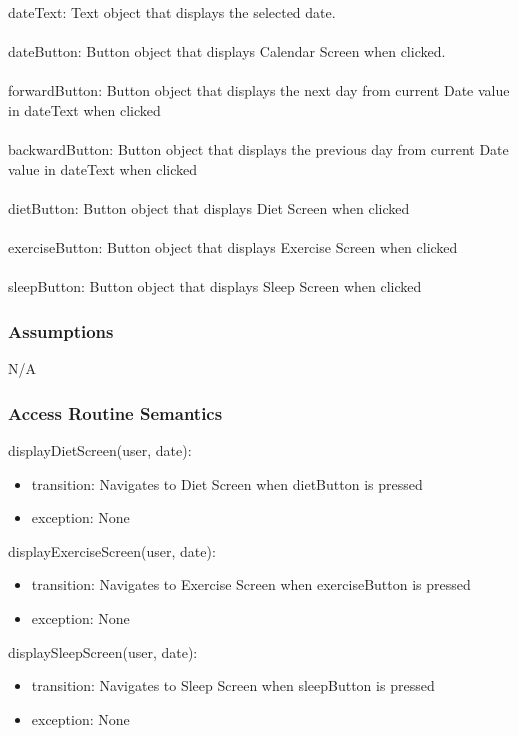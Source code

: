 \documentclass[12pt, titlepage]{article}
\begin{document}
dateText: Text object that displays the selected date.\\\\
dateButton: Button object that displays Calendar Screen when clicked.\\\\
forwardButton: Button object that displays the next day from current Date value in dateText when clicked\\\\
backwardButton: Button object that displays the previous day from current Date value in dateText when clicked\\\\
dietButton: Button object that displays Diet Screen when clicked\\\\
exerciseButton: Button object that displays Exercise Screen when clicked\\\\
sleepButton: Button object that displays Sleep Screen when clicked

\subsubsection{Assumptions}

N/A

\subsubsection{Access Routine Semantics}

\noindent displayDietScreen(user, date):
\begin{itemize}
	\item transition: Navigates to Diet Screen when dietButton is pressed 
	\item exception: None 
\end{itemize}

\noindent displayExerciseScreen(user, date):
\begin{itemize}
	\item transition: Navigates to Exercise Screen when exerciseButton is pressed
	\item exception: None 
\end{itemize}

\noindent displaySleepScreen(user, date):
\begin{itemize}
	\item transition: Navigates to Sleep Screen when sleepButton is pressed
	\item exception: None 
\end{itemize}
\end{document}

